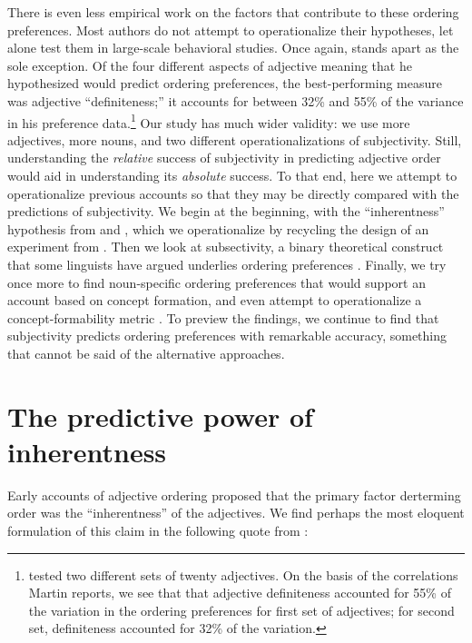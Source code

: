 \documentclass[12pt]{article}
\begin{document}
There is even less empirical work on the factors that contribute to these ordering preferences. Most authors do not attempt to operationalize their hypotheses, let alone test them in large-scale behavioral studies. Once again, \citet{martin1969} stands apart as the sole exception. Of the four different aspects of adjective meaning that he hypothesized would predict ordering preferences, the best-performing measure was adjective ``definiteness;'' it accounts for between 32\% and 55\% of the variance in his preference data.\footnote{\citet{martin1969} tested two different sets of twenty adjectives. On the basis of the correlations Martin reports, we see that that adjective definiteness accounted for 55\% of the variation in the ordering preferences for first set of adjectives; for second set, definiteness accounted for 32\% of the variation.} Our study has much wider validity: we use more adjectives, more nouns, and two different operationalizations of subjectivity. Still, understanding the \emph{relative} success of subjectivity in predicting adjective order would aid in understanding its \emph{absolute} success. To that end, here we attempt to operationalize previous accounts so that they may be directly compared with the predictions of subjectivity. We begin at the beginning, with the ``inherentness'' hypothesis from \citet{sweet1898} and \citet{whorf1945}, which we operationalize by recycling the design of an experiment from \citet{martin1969}. Then we look at subsectivity, a binary theoretical construct that some linguists have argued underlies ordering preferences \citep[e.g.,][]{truswell2009}. Finally, we try once more to find noun-specific ordering preferences that would support an account based on concept formation, and even attempt to operationalize a concept-formability metric \citep{McNally2004,bouchard2005,svenonius2008}. To preview the findings, we continue to find that subjectivity predicts ordering preferences with remarkable accuracy, something that cannot be said of the alternative approaches.

\section{The predictive power of inherentness}

Early accounts of adjective ordering proposed that the primary factor derterming order was the ``inherentness'' of the adjectives. We find perhaps the most eloquent formulation of this claim in the following quote from \cite[p.~5]{whorf1945}: 
\end{document}
